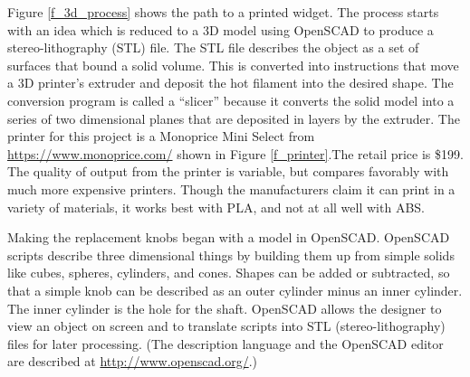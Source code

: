 \documentclass[12pt]{article}
\begin{document}
Figure \ref{f_3d_process} shows the path to a printed widget.  The
process starts with an idea which is reduced to a 3D model using
OpenSCAD to produce a stereo-lithography (STL) file.  The STL file
describes the object as a set of surfaces that bound a solid volume.
This is converted into instructions that move a 3D printer's extruder
and deposit the hot filament into the desired shape. The conversion
program is called a ``slicer'' because it converts the solid model
into a series of two dimensional planes that are deposited in layers
by the extruder.  The printer for this project is a Monoprice Mini
Select from \url{https://www.monoprice.com/} shown in Figure
\ref{f_printer}.The retail price is \$199. The quality of output from
the printer is variable, but compares favorably with much more
expensive printers. Though the manufacturers claim it can print in a
variety of materials, it works best with PLA, and not at all well with
ABS.

\begin{figure}[tb]
\end{figure}

Making the replacement knobs began with a model in OpenSCAD. OpenSCAD
scripts describe three dimensional things by building them
up from simple solids like cubes, spheres, cylinders, and cones.
Shapes can be added or subtracted, so that a simple knob can be
described as an outer cylinder minus an inner cylinder.  The inner
cylinder is the hole for the shaft. OpenSCAD allows the designer to
view an object on screen and to translate scripts into STL (stereo-lithography)
files for later processing. (The description language and the OpenSCAD
editor are described at \url{http://www.openscad.org/}.)
\end{document}
